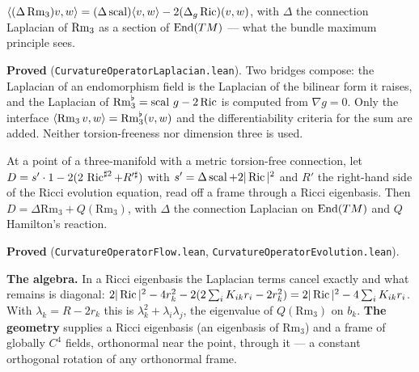 \begin{lemma}
  \label{lem:curvature-operator-laplacian}
  \leanok
  $\langle (\Delta \operatorname{Rm}_3)v, w\rangle = (\Delta\operatorname{scal})\langle v,w\rangle
   - 2(\Delta_g\operatorname{Ric})(v,w)$, with $\Delta$ the connection Laplacian of $\operatorname{Rm}_3$ as a section of
  $\operatorname{End}(TM)$ --- what the bundle maximum principle sees.

  \textbf{Proved} (\texttt{CurvatureOperatorLaplacian.lean}). Two bridges compose: the
  Laplacian of an endomorphism field is the Laplacian of the bilinear form it raises, and the
  Laplacian of $\operatorname{Rm}_3^\flat = \operatorname{scal}\,g - 2\operatorname{Ric}$ is computed from $\nabla g = 0$.
  Only the interface $\langle \operatorname{Rm}_3 v, w\rangle = \operatorname{Rm}_3^\flat(v,w)$ and the differentiability
  criteria for the sum are added. Neither torsion-freeness nor dimension three is used.
\end{lemma}

\begin{lemma}
  \label{lem:curvature-operator-evolution}
  \leanok
  At a point of a three-manifold with a metric torsion-free connection, let
  $D = s'\cdot 1 - 2(2\,\operatorname{Ric}^{\sharp 2} + R'^\sharp)$ with $s' = \Delta\operatorname{scal} + 2|\operatorname{Ric}|^2$ and
  $R'$ the right-hand side of the Ricci evolution equation, read off a frame through a Ricci
  eigenbasis. Then $D = \Delta\mathrm{Rm}_3 + Q(\mathrm{Rm}_3)$, with $\Delta$ the connection
  Laplacian on $\operatorname{End}(TM)$ and $Q$ Hamilton's reaction.

  \textbf{Proved} (\texttt{CurvatureOperatorFlow.lean}, \texttt{CurvatureOperatorEvolution.lean}).

  \textbf{The algebra.} In a Ricci eigenbasis the Laplacian terms cancel exactly and what
  remains is diagonal: $2|\operatorname{Ric}|^2 - 4r_k^2 - 2(2\sum_i K_{ik}r_i - 2r_k^2) = 2|\operatorname{Ric}|^2 - 4\sum_i
  K_{ik} r_i$. With $\lambda_k = R - 2r_k$ this is $\lambda_k^2 + \lambda_i\lambda_j$, the
  eigenvalue of $Q(\mathrm{Rm}_3)$ on $b_k$. \textbf{The geometry} supplies a Ricci eigenbasis
  (an eigenbasis of $\mathrm{Rm}_3$) and a frame of globally $C^4$ fields, orthonormal near the
  point, through it --- a constant orthogonal rotation of any orthonormal frame.
\end{lemma}

